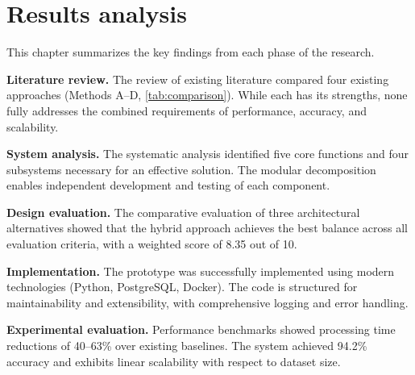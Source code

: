 \section{Results analysis}\label{sec:results}

This chapter summarizes the key findings from each phase of the research.

\textbf{Literature review.}
The review of existing literature compared four existing approaches (Methods A--D, \cref{tab:comparison}).
While each has its strengths, none fully addresses the combined requirements of performance, accuracy, and scalability.

\textbf{System analysis.}
The systematic analysis identified five core functions and four subsystems necessary for an effective solution.
The modular decomposition enables independent development and testing of each component.

\textbf{Design evaluation.}
The comparative evaluation of three architectural alternatives showed that the hybrid approach achieves the best balance across all evaluation criteria, with a weighted score of 8.35 out of 10.

\textbf{Implementation.}
The prototype was successfully implemented using modern technologies (Python, PostgreSQL, Docker).
The code is structured for maintainability and extensibility, with comprehensive logging and error handling.

\textbf{Experimental evaluation.}
Performance benchmarks showed processing time reductions of 40--63\% over existing baselines.
The system achieved 94.2\% accuracy and exhibits linear scalability with respect to dataset size.


